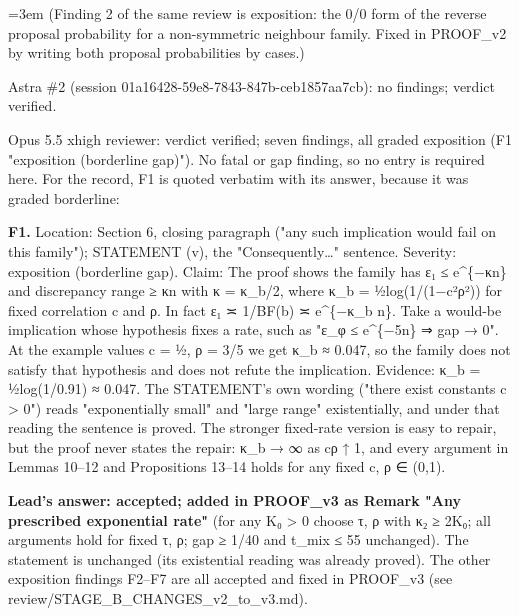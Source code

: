 \documentclass[11pt]{report}
\newenvironment{mdblock}{\begingroup\mdfont\raggedright\setlength{\parindent}{0pt}\setlength{\parskip}{0.55em}\emergencystretch=3em}{\par\endgroup}
\newenvironment{mdquote}{\begin{list}{}{\setlength{\leftmargin}{1.2em}\setlength{\rightmargin}{0pt}\setlength{\topsep}{2pt}\setlength{\parsep}{0.55em}\setlength{\itemsep}{0pt}}\item\relax}{\end{list}}
\newcommand{\mdhead}[2]{\par\vspace{0.7em}\noindent{\bfseries\ifcase#1\or\large\or\normalsize\or\normalsize\or\small\or\small\or\small\fi #2}\par\nopagebreak\vspace{0.1em}}
\begin{document}
\begin{mdblock}
(Finding 2 of the same review is exposition: the 0/0 form of the reverse proposal probability for a non-symmetric neighbour family. Fixed in PROOF\_v2 by writing both proposal probabilities by cases.)

\mdhead{2}{Stage B (independent reviews of PROOF\_v2)}

\begin{mdbul}
\item Astra \#2 (session 01a16428-59e8-7843-847b-ceb1857aa7cb): no findings; verdict verified.
\item Opus 5.5 xhigh reviewer: verdict verified; seven findings, all graded exposition (F1 "exposition (borderline gap)"). No fatal or gap finding, so no entry is required here. For the record, F1 is quoted verbatim with its answer, because it was graded borderline:
\end{mdbul}

\begin{mdquote}
\textbf{F1.} Location: Section 6, closing paragraph ("any such implication would fail on this family"); STATEMENT (v), the "Consequently…" sentence. Severity: exposition (borderline gap). Claim: The proof shows the family has ε₁ ≤ e\textasciicircum{}\{−κn\} and discrepancy range ≥ κn with κ = κ\_b/2, where κ\_b = ½log(1/(1−c²ρ²)) for fixed correlation c and ρ. In fact ε₁ ≍ 1/BF(b) ≍ e\textasciicircum{}\{−κ\_b n\}. Take a would-be implication whose hypothesis fixes a rate, such as "ε\_φ ≤ e\textasciicircum{}\{−5n\} ⇒ gap → 0". At the example values c = ½, ρ = 3/5 we get κ\_b ≈ 0.047, so the family does not satisfy that hypothesis and does not refute the implication. Evidence: κ\_b = ½log(1/0.91) ≈ 0.047. The STATEMENT's own wording ("there exist constants c > 0") reads "exponentially small" and "large range" existentially, and under that reading the sentence is proved. The stronger fixed-rate version is easy to repair, but the proof never states the repair: κ\_b → ∞ as cρ ↑ 1, and every argument in Lemmas 10–12 and Propositions 13–14 holds for any fixed c, ρ ∈ (0,1).
\end{mdquote}

\textbf{Lead's answer: accepted; added in PROOF\_v3 as Remark "Any prescribed exponential rate"} (for any K₀ > 0 choose τ, ρ with κ₂ ≥ 2K₀; all arguments hold for fixed τ, ρ; gap ≥ 1/40 and t\_mix ≤ 55 unchanged). The statement is unchanged (its existential reading was already proved). The other exposition findings F2–F7 are all accepted and fixed in PROOF\_v3 (see review/STAGE\_B\_CHANGES\_v2\_to\_v3.md).
\end{mdblock}
\end{document}

